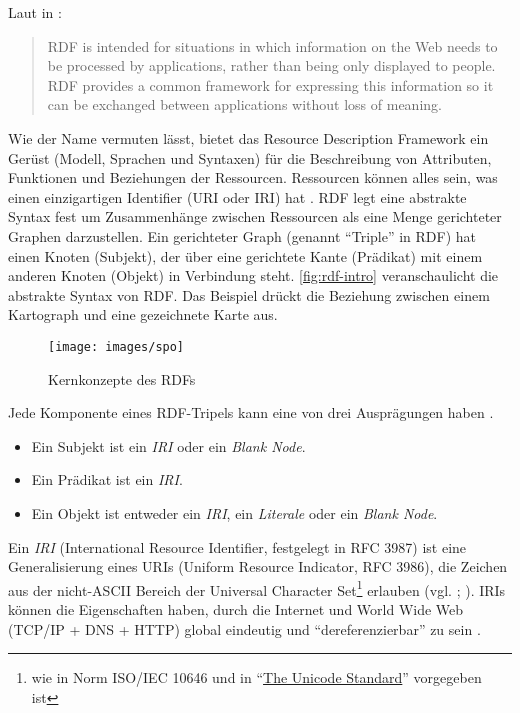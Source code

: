Laut \citeauthor{Schreiber:14:RP} in : 

\hyphenblockquote{german}{RDF is intended for situations in which information on the Web needs to be processed by applications, rather than being only displayed to people. RDF provides a common framework for expressing this information so it can be exchanged between applications without loss of meaning.} 

Wie der Name vermuten lässt, bietet das Resource Description Framework ein Gerüst (Modell, Sprachen und Syntaxen) für die Beschreibung von Attributen, Funktionen und Beziehungen der Ressourcen. Ressourcen können alles sein, was einen einzigartigen Identifier (URI oder IRI) hat \parencite[vgl.][Folie~6]{Dekeyzer2013}. RDF legt eine abstrakte Syntax fest um Zusammenhänge zwischen Ressourcen als eine Menge gerichteter Graphen darzustellen. Ein gerichteter Graph (genannt \hyphenquote{german}{Triple} in RDF) hat einen Knoten (Subjekt), der über eine gerichtete Kante (Prädikat) mit einem anderen Knoten (Objekt) in Verbindung steht. \autoref{fig:rdf-intro} veranschaulicht die abstrakte Syntax von RDF. Das Beispiel\footnotemark{} drückt die Beziehung zwischen einem Kartograph und eine gezeichnete Karte aus.


\begin{figure}[h]
	\centering
	\texttt{[image: images/spo]}
	\caption[Kernkonzepte des RDFs]{Kernkonzepte des RDFs}
	\label{fig:spo}
\end{figure}

Jede Komponente eines RDF-Tripels kann eine von drei Ausprägungen haben \parencite[vgl.][Abs.~3.1]{Wood:14:RCA}.

\begin{itemize}
	\item Ein Subjekt ist ein \textit{IRI} oder ein \textit{Blank Node}.
	\item Ein Prädikat ist ein \textit{IRI}.
	\item Ein Objekt ist entweder ein \textit{IRI}, ein \textit{Literale} oder ein \textit{Blank Node}.
\end{itemize}

Ein \textit{IRI} (International Resource Identifier, festgelegt in RFC 3987) ist eine Generalisierung eines URIs (Uniform Resource Indicator, RFC 3986), die Zeichen aus der nicht-ASCII Bereich der Universal Character Set\footnote{wie in Norm ISO/IEC 10646 und in \hyphenquote{german}{\href{http://www.unicode.org/versions/latest}{The Unicode Standard}} vorgegeben ist} erlauben (vgl. \cite[][Abs~3.2]{Schreiber:14:RP}; \cite[]{rfc3987}). IRIs können die Eigenschaften haben, durch die Internet und World Wide Web (TCP/IP + DNS + HTTP) global eindeutig und \hyphenquote{german}{dereferenzierbar} zu sein \parencite[vgl.][Abs.~2]{Jacobs:04:AWW}. 

